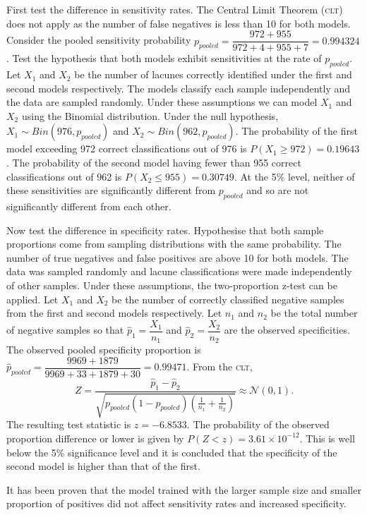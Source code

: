 First test the difference in sensitivity rates. The Central Limit Theorem (\textsc{clt}) does not apply as the number of false negatives is less than 10 for both models. Consider the pooled sensitivity probability $p_{pooled} = \dfrac{972+955}{972+4+955+7} = 0.994324$. Test the hypothesis that both models exhibit sensitivities at the rate of $p_{pooled}$. Let $X_1$ and $X_2$ be the number of lacunes correctly identified under the first and second models respectively. The models classify each sample independently and the data are sampled randomly. Under these assumptions we can model $X_1$ and $X_2$ using the Binomial distribution. Under the null hypothesis, $X_1 \sim Bin(976, p_{pooled})$ and $X_2 \sim Bin(962, p_{pooled})$. The probability of the first model exceeding 972 correct classifications out of 976 is $P(X_1 \geq 972) = 0.19643$. The probability of the second model having fewer than 955 correct classifications out of 962 is $P(X_2 \leq 955) = 0.30749$. At the 5\% level, neither of these sensitivities are significantly different from $p_{pooled}$ and so are not significantly different from each other.

Now test the difference in specificity rates. Hypothesise that both sample proportions come from sampling distributions with the same probability. The number of true negatives and false positives are above 10 for both models. The data was sampled randomly and lacune classifications were made independently of other samples. Under these assumptions, the two-proportion z-test can be applied. Let $X_1$ and $X_2$ be the number of correctly classified negative samples from the first and second models respectively. Let $n_1$ and $n_2$ be the total number of negative samples so that $\hat{p}_1 = \dfrac{X_1}{n_1}$ and $\hat{p}_2 = \dfrac{X_2}{n_2}$ are the observed specificities. The observed pooled specificity proportion is $\hat p_{pooled} = \dfrac{9969+1879}{9969+33+1879+30} = 0.99471$. From the \textsc{clt},
\[
	Z = \dfrac{\hat{p}_1 - \hat{p}_2}{\sqrt{p_{pooled}(1 - p_{pooled})\left(\frac{1}{n_1} + \frac{1}{n_2}\right)}} \approx \mathcal{N}(0,1).
\]
The resulting test statistic is $z = -6.8533$. The probability of the observed proportion difference or lower is given by $P(Z < z) = 3.61\times10^{-12}$. This is well below the 5\% significance level and it is concluded that the specificity of the second model is higher than that of the first.

It has been proven that the model trained with the larger sample size and smaller proportion of positives did not affect sensitivity rates and increased specificity. 

